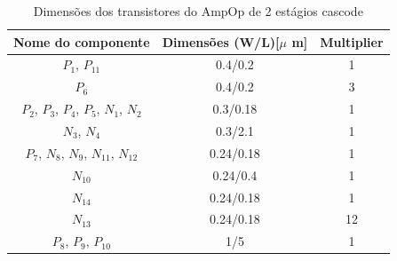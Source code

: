 \begin{table}[htb]
\centering
\begin{tabular}{c|c|c}
\hline 
\hline 
\textbf{Nome do componente} & \textbf{Dimensões (W/L)[$\mu$ m]} & Multiplier \\ 
\hline 
\hline 
$P_1$, $P_11$   & 0.4/0.2 & 1 \\  \hline
$P_6$   & 0.4/0.2 & 3 \\  \hline
$P_2$, $P_3$, $P_4$, $P_5$, $N_1$, $N_2$ & 0.3/0.18 & 1 \\  \hline
$N_3$, $N_4$ & 0.3/2.1 & 1 \\  \hline
$P_7$, $N_8$, $N_9$, $N_{11}$, $N_{12}$ & 0.24/0.18 & 1 \\  \hline
$N_{10}$ & 0.24/0.4 & 1 \\  \hline
$N_{14}$ & 0.24/0.18 & 1 \\  \hline
$N_{13}$ & 0.24/0.18 & 12 \\  \hline
$P_8$, $P_9$, $P_{10}$ & 1/5 & 1 \\  \hline
\end{tabular} 
\caption{Dimensões dos transistores do AmpOp de 2 estágios cascode}
\label{tab:ampop}
\end{table}


